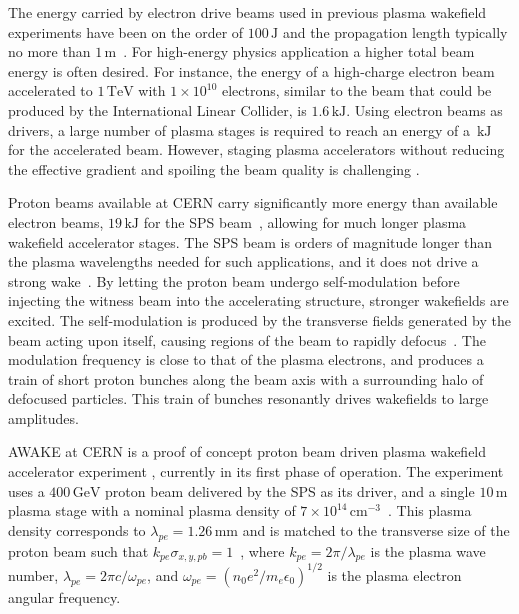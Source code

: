 \documentclass[aps,prstab,reprint,amsmath,amssymb,groupedaddress]{revtex4-1}
\newcommand{\unit}[1]{\,\mathrm{#1}}
\newcommand{\nexp}[1]{\times 10^{#1}}
\begin{document}
The energy carried by electron drive beams used in previous plasma wakefield experiments have been on the order of $100\unit{J}$ and the propagation length typically no more than $1\unit{m}$~\cite{blumenfeld:2007, caldwell:2009}. For high-energy physics application a higher total beam energy is often desired. For instance, the energy of a high-charge electron beam accelerated to $1\unit{TeV}$ with $1\nexp{10}$ electrons, similar to the beam that could be produced by the International Linear Collider, is $1.6\unit{kJ}$. Using electron beams as drivers, a large number of plasma stages is required to reach an energy of a $\unit{kJ}$ for the accelerated beam. However, staging plasma accelerators without reducing the effective gradient and spoiling the beam quality is challenging \cite{steinke:2016, lindstrom:2016}.

Proton beams available at CERN carry significantly more energy than available electron beams, $19\unit{kJ}$ for the SPS beam~\cite{gschwendtner:2016}, allowing for much longer plasma wakefield accelerator stages. The SPS beam is orders of magnitude longer than the plasma wavelengths needed for such applications, and it does not drive a strong wake~\cite{gschwendtner:2016}. By letting the proton beam undergo self-modulation before injecting the witness beam into the accelerating structure, stronger wakefields are excited. The self-modulation is produced by the transverse fields generated by the beam acting upon itself, causing regions of the beam to rapidly defocus~\cite{kumar:2010}. The modulation frequency is close to that of the plasma electrons, and produces a train of short proton bunches along the beam axis with a surrounding halo of defocused particles. This train of bunches resonantly drives wakefields to large amplitudes.

AWAKE at CERN is a proof of concept proton beam driven plasma wakefield accelerator experiment \cite{awake_collaboration:2014}, currently in its first phase of operation. The experiment uses a $400\unit{GeV}$ proton beam delivered by the SPS as its driver, and a single $10\unit{m}$ plasma stage with a nominal plasma density of $7\nexp{14}\unit{cm}^{-3}$~\cite{gschwendtner:2016}. This plasma density corresponds to $\lambda_{pe} = 1.26\unit{mm}$ and is matched to the transverse size of the proton beam such that $k_{pe}\sigma_{x,y,pb} = 1$~\cite{lu:2005}, where $k_{pe} = 2\pi/\lambda_{pe}$ is the plasma wave number, $\lambda_{pe} = 2\pi c/\omega_{pe}$, and $\omega_{pe} = \left(n_0e^2/m_e\epsilon_0\right)^{1/2}$ is the plasma electron angular frequency.
\end{document}
